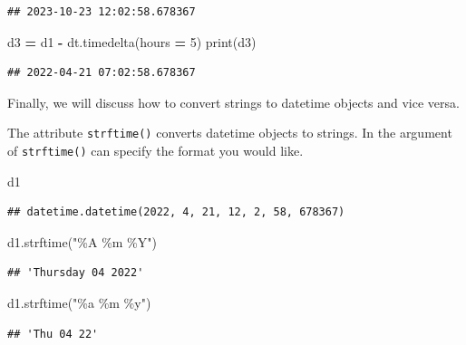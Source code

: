 \documentclass[
]{book}
\newenvironment{Shaded}{\begin{snugshade}}{\end{snugshade}}
\newcommand{\BuiltInTok}[1]{#1}
\newcommand{\DecValTok}[1]{\textcolor[rgb]{0.00,0.00,0.81}{#1}}
\newcommand{\NormalTok}[1]{#1}
\newcommand{\OperatorTok}[1]{\textcolor[rgb]{0.81,0.36,0.00}{\textbf{#1}}}
\newcommand{\StringTok}[1]{\textcolor[rgb]{0.31,0.60,0.02}{#1}}
\begin{document}
\begin{verbatim}
## 2023-10-23 12:02:58.678367
\end{verbatim}

\begin{Shaded}
\begin{Highlighting}[]
\NormalTok{d3 }\OperatorTok{=}\NormalTok{ d1 }\OperatorTok{{-}}\NormalTok{ dt.timedelta(hours }\OperatorTok{=} \DecValTok{5}\NormalTok{)}
\BuiltInTok{print}\NormalTok{(d3)}
\end{Highlighting}
\end{Shaded}

\begin{verbatim}
## 2022-04-21 07:02:58.678367
\end{verbatim}

Finally, we will discuss how to convert strings to datetime objects and vice versa.

The attribute \texttt{strftime()} converts datetime objects to strings. In the argument of \texttt{strftime()} can specify the format you would like.

\begin{Shaded}
\begin{Highlighting}[]
\NormalTok{d1}
\end{Highlighting}
\end{Shaded}

\begin{verbatim}
## datetime.datetime(2022, 4, 21, 12, 2, 58, 678367)
\end{verbatim}

\begin{Shaded}
\begin{Highlighting}[]
\NormalTok{d1.strftime(}\StringTok{"\%A \%m \%Y"}\NormalTok{)}
\end{Highlighting}
\end{Shaded}

\begin{verbatim}
## 'Thursday 04 2022'
\end{verbatim}

\begin{Shaded}
\begin{Highlighting}[]
\NormalTok{d1.strftime(}\StringTok{"\%a \%m \%y"}\NormalTok{)}
\end{Highlighting}
\end{Shaded}

\begin{verbatim}
## 'Thu 04 22'
\end{verbatim}
\end{document}
